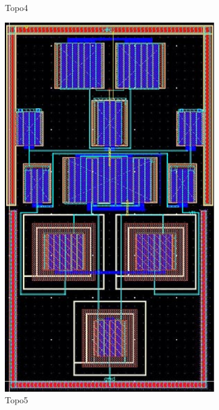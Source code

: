 \begin{figure}[ht]
\begin{subfigure}[t]{0.2\textwidth}
        \caption{Topo4}\label{fig:Topo4}
        \end{subfigure}
        \begin{subfigure}[t]{0.2\textwidth}
        \includegraphics[width=\textwidth]{Fig/MultTopo_Topo5.eps}
        \caption{Topo5}\label{fig:Topo5}
        \end{subfigure}
        \begin{subfigure}[t]{0.2\textwidth}

\end{subfigure}
\end{figure}

